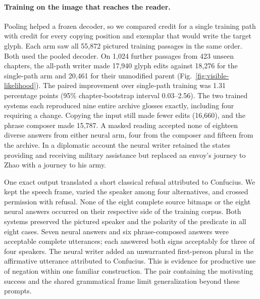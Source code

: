 \paragraph{Training on the image that reaches the reader.}
Pooling helped a frozen decoder, so we compared credit for a single training path with credit for every copying position and exemplar that would write the target glyph. Each arm saw all 55,872 pictured training passages in the same order. Both used the pooled decoder. On 1,024 further passages from 423 unseen chapters, the all-path writer made 17,940 glyph edits against 18,276 for the single-path arm and 20,461 for their unmodified parent (Fig.~\ref{fig:visible-likelihood}). The paired improvement over single-path training was 1.31 percentage points (95\% chapter-bootstrap interval 0.03--2.56). The two trained systems each reproduced nine entire archive glosses exactly, including four requiring a change. Copying the input still made fewer edits (16,660), and the phrase composer made 15,787. A masked reading accepted none of eighteen diverse answers from either neural arm, four from the composer and fifteen from the archive. In a diplomatic account the neural writer retained the states providing and receiving military assistance but replaced an envoy's journey to Zhao with a journey to his army.

One exact output translated a short classical refusal attributed to Confucius. We kept the speech frame, varied the speaker among four alternatives, and crossed permission with refusal. None of the eight complete source bitmaps or the eight neural answers occurred on their respective side of the training corpus. Both systems preserved the pictured speaker and the polarity of the predicate in all eight cases. Seven neural answers and six phrase-composed answers were acceptable complete utterances; each answered both signs acceptably for three of four speakers. The neural writer added an unwarranted first-person plural in the affirmative utterance attributed to Confucius. This is evidence for productive use of negation within one familiar construction. The pair containing the motivating success and the shared grammatical frame limit generalization beyond these prompts.
